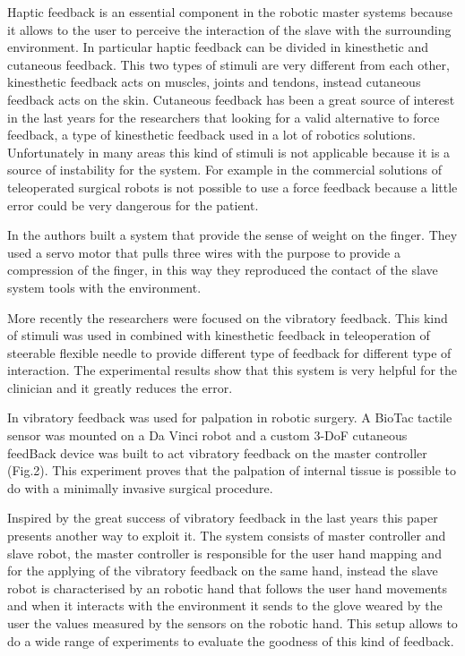 \IEEEPARstart
{H}{aptic} feedback is an essential component in the robotic master systems because it allows to the user to perceive the interaction of the slave with the surrounding environment. 
In particular haptic feedback can be divided in kinesthetic and cutaneous feedback. This two types of stimuli are very different from each other, kinesthetic feedback acts on muscles, joints and tendons, instead cutaneous feedback acts on the skin.
Cutaneous feedback has been a great source of interest in the last years for the researchers that looking for a valid alternative to force feedback, a type of kinesthetic feedback used in a lot of robotics solutions. Unfortunately in many areas this kind of stimuli is not applicable because it is a source of instability for the system. For example in the commercial solutions of teleoperated surgical robots is not possible to use a force feedback because a little error could be very dangerous for the patient.
\par
In \cite{pacchierotti2012two} the authors built a system that provide the sense of weight on the finger. They used a servo motor that pulls three wires with the purpose to provide a compression of the finger, in this way they reproduced the contact of the slave system tools with the environment.
\par
More recently the researchers were focused on the vibratory feedback. This kind of stimuli was used in \cite{pacchierotti2014teleoperation} combined with kinesthetic feedback in teleoperation of steerable flexible needle to provide different type of feedback for different type of interaction.
The experimental results show that this system is very helpful for the clinician and it greatly reduces the error.
\par
In \cite{pacchierotti2015cutaneous} vibratory feedback was used for palpation in robotic surgery. A BioTac tactile sensor was mounted on a Da Vinci robot and a custom 3-DoF cutaneous feedBack device was built to act vibratory feedback on the master controller (Fig.2). This experiment proves that the palpation of internal tissue is possible to do with a minimally invasive surgical procedure.
\par
Inspired by the great success of vibratory feedback in the last years this paper presents another way to exploit it. 
The system consists of master controller and slave robot, the master controller is responsible for the user hand mapping and for the applying of the vibratory feedback on the same hand, instead the slave robot is characterised by an robotic hand that follows the user hand movements and when it interacts with the environment it sends to the glove weared by the user the values measured by the sensors on the robotic hand. This setup allows to do a wide range of experiments to evaluate the goodness of this kind of feedback.


